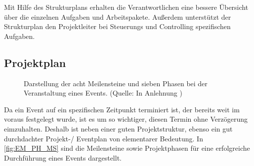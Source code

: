 Mit Hilfe des Strukturplans erhalten die Verantwortlichen eine bessere Übersicht über die einzelnen Aufgaben und Arbeitspakete.
Außerdem unterstützt der Strukturplan den Projektleiter bei Steuerungs und Controlling spezifischen Aufgaben.\autocite[Vgl.][S. 144 f.]{Holzbaur.2002}

\subsection{Projektplan}
\begin{figure}[H]
    \centering
    \setlength{\fboxsep}{10pt}
    \setlength{\fboxrule}{0.5pt}
    \caption[Eventmanagement: Meilensteine und Phase eines Events]{Darstellung der acht Meilensteine und sieben Phasen bei der Veranstaltung eines Events. (Quelle: In Anlehnung \autocite[Vgl.][S. 23]{Holzbaur.2002})} \label{fig:EM_PH_MS}
\end{figure}

Da ein Event auf ein spezifischen Zeitpunkt terminiert ist, der bereits weit im voraus festgelegt wurde, ist es um so wichtiger, diesen Termin ohne Verzögerung eimzuhalten.
Deshalb ist neben einer guten Projektstruktur, ebenso ein gut durchdachter Projekt-/ Eventplan von elementarer Bedeutung.
In \autoref{fig:EM_PH_MS} sind die  Meilensteine sowie Projektphasen für eine erfolgreiche Durchführung eines Events dargestellt.

